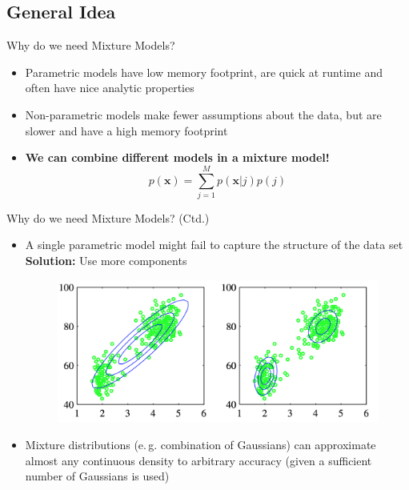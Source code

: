 \subsection{General Idea}

\begin{frame}{Why do we need Mixture Models?}{}
	\begin{itemize}
		\item Parametric models have low memory footprint, are quick at runtime and often have nice analytic properties
		\item Non-parametric models make fewer assumptions about the data, but are slower and have a high memory footprint
		\item \textbf{We can combine different models in a mixture model!}
		\begin{equation}
			p(\bm{x}) = \sum_{j=1}^M p(\bm{x}|j) p(j)
		\end{equation}
	\end{itemize}
\end{frame}

\begin{frame}{Why do we need Mixture Models? (Ctd.)}{}
	\begin{itemize}
		\item A single parametric model might fail to capture the structure of the data set \\
			\textbf{Solution:} Use more components
		\begin{figure}
			\centering
			\includegraphics[scale=0.3]{04_density_estimation/02_img/mixture_models.png}
		\end{figure}
		\item Mixture distributions (e.\,g. combination of Gaussians) can approximate almost any continuous density to arbitrary accuracy (given a sufficient number of Gaussians is used)
	\end{itemize}
\end{frame}



